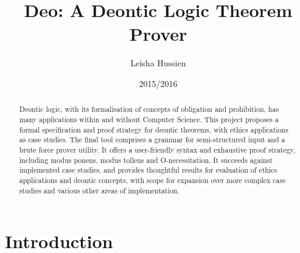\documentclass{l4proj}
\begin{document}
\title{Deo: A Deontic Logic Theorem Prover}
\author{Leisha Hussien}
\date{2015/2016}
\maketitle

\begin{abstract}
Deontic logic, with its formalisation of concepts of obligation and prohibition, has many applications within and without Computer Science. This project proposes a formal specification and proof strategy for deontic theorems, with ethics applications as case studies. The final tool comprises a grammar for semi-structured input and a brute force prover utility. It offers a user-friendly syntax and exhaustive proof strategy, including modus ponens, modus tollens and O-necessitation. It succeeds against implemented case studies, and provides thoughtful results for evaluation of ethics applications and deontic concepts, with scope for expansion over more complex case studies and various other areas of implementation. 
\end{abstract}

\educationalconsent

\tableofcontents













\chapter{Introduction}
\end{document}
